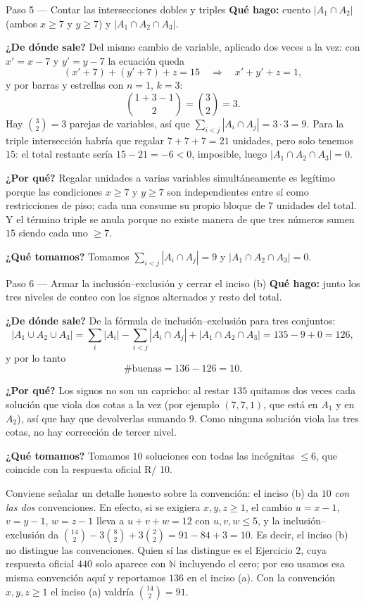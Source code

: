 \documentclass[11pt]{article}
\begin{document}
\begin{paso}{Paso 5 --- Contar las intersecciones dobles y triples}
\textbf{Qué hago:} cuento $|A_1\cap A_2|$ (ambos $x\ge 7$ y $y\ge 7$) y $|A_1\cap A_2\cap A_3|$.

\textbf{¿De dónde sale?} Del mismo cambio de variable, aplicado dos veces a la vez: con $x'=x-7$ y
$y'=y-7$ la ecuación queda
\[
(x'+7)+(y'+7)+z=15 \quad\Longrightarrow\quad x'+y'+z=1,
\]
y por barras y estrellas con $n=1$, $k=3$:
\[
\binom{1+3-1}{2}=\binom{3}{2}=3.
\]
Hay $\binom{3}{2}=3$ parejas de variables, así que $\sum_{i<j}|A_i\cap A_j|=3\cdot 3=9$. Para la
triple intersección habría que regalar $7+7+7=21$ unidades, pero solo tenemos $15$: el total restante
sería $15-21=-6<0$, imposible, luego $|A_1\cap A_2\cap A_3|=0$.

\textbf{¿Por qué?} Regalar unidades a varias variables simultáneamente es legítimo porque las
condiciones $x\ge 7$ y $y\ge 7$ son independientes entre sí como restricciones de piso; cada una
consume su propio bloque de $7$ unidades del total. Y el término triple se anula porque no existe
manera de que tres números sumen $15$ siendo cada uno $\ge 7$.

\textbf{¿Qué tomamos?} Tomamos $\sum_{i<j}|A_i\cap A_j|=9$ y $|A_1\cap A_2\cap A_3|=0$.
\end{paso}

\begin{paso}{Paso 6 --- Armar la inclusión--exclusión y cerrar el inciso (b)}
\textbf{Qué hago:} junto los tres niveles de conteo con los signos alternados y resto del total.

\textbf{¿De dónde sale?} De la fórmula de inclusión--exclusión para tres conjuntos:
\[
|A_1\cup A_2\cup A_3|=\sum_i|A_i|-\sum_{i<j}|A_i\cap A_j|+|A_1\cap A_2\cap A_3|
=135-9+0=126,
\]
y por lo tanto
\[
\#\text{buenas}=136-126=10.
\]

\textbf{¿Por qué?} Los signos no son un capricho: al restar $135$ quitamos dos veces cada solución que
viola dos cotas a la vez (por ejemplo $(7,7,1)$, que está en $A_1$ y en $A_2$), así que hay que
devolverlas sumando $9$. Como ninguna solución viola las tres cotas, no hay corrección de tercer
nivel.

\textbf{¿Qué tomamos?} Tomamos $10$ soluciones con todas las incógnitas $\le 6$, que coincide con la
respuesta oficial R/ 10.
\end{paso}

\begin{nota}
Conviene señalar un detalle honesto sobre la convención: el inciso (b) da $10$ \emph{con las dos}
convenciones. En efecto, si se exigiera $x,y,z\ge 1$, el cambio $u=x-1$, $v=y-1$, $w=z-1$ lleva a
$u+v+w=12$ con $u,v,w\le 5$, y la inclusión--exclusión da
$\binom{14}{2}-3\binom{8}{2}+3\binom{2}{2}=91-84+3=10$. Es decir, el inciso (b) no distingue las
convenciones. Quien sí las distingue es el Ejercicio 2, cuya respuesta oficial $440$ solo aparece con
$\mathbb{N}$ incluyendo el cero; por eso usamos esa misma convención aquí y reportamos $136$ en el
inciso (a). Con la convención $x,y,z\ge 1$ el inciso (a) valdría $\binom{14}{2}=91$.
\end{nota}
\end{document}
